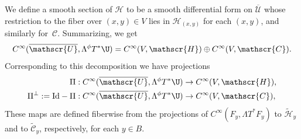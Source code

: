 \documentclass[JEP,XML,SOM,Unicode,NoFloatCountersInSection,published]{cedram}
\theoremstyle{plain}
\theoremstyle{definition}
\newcommand{\Umathbar}{{\overline{\mathscr{U}}}}
\newcommand{\Cinf}{C^\infty}
\newcommand{\phiT}{{}^\phi T}
\begin{document}
We define a smooth section of $\mathscr{H}$ to be a smooth differential form on $\overline{\mathscr{U}}$ whose restric\-tion to the fiber over $(x,y)\in V$ lies in $\mathscr{H}_{(x,y)}$ for each $(x,y)$, and similarly for~$\mathscr{C}$. Summarizing, we get
\begin{equation}
\label{eqn:Cinf decomp}
\Cinf(\Umathbar,\Lambda \phiT^*\U) = \Cinf(V, \mathscr{H}) \oplus \Cinf(V,\mathscr{C}).
\end{equation}
Corresponding to this decomposition we have projections
\begin{equation}\label{projections-def}
\begin{split}
\Pi: \Cinf(\Umathbar,\Lambda \phiT^*\U) &\to \Cinf(V, \mathscr{H}), \\
\Pi^{\perp} := \text{Id} - \Pi: \Cinf(\Umathbar,\Lambda \phiT^*\U) &\to \Cinf(V,\mathscr{C}),
\end{split}
\end{equation}
These maps are defined fiberwise from the projections of $\Cinf(F_y,\Lambda T^*F_y)$ to $\widetilde{\mathscr{H}}_y$ and to $\widetilde{\mathscr{C}}_y$, respectively, for each $y \in B$.
\end{document}
